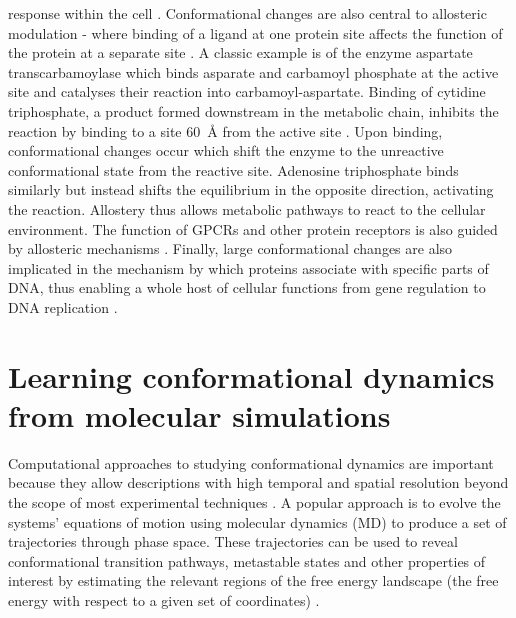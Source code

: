 response within the cell \cite{bockenhauerConformationalDynamicsSingle2011a}. Conformational changes are also central to allosteric modulation - where binding of a ligand at one protein site affects the function of the protein at a separate site \cite{liuAllosteryOverviewIts2016}. A classic example is of the enzyme aspartate transcarbamoylase which binds asparate and carbamoyl phosphate at the active site and catalyses their reaction into carbamoyl-aspartate. Binding of cytidine triphosphate, a product formed downstream in the metabolic chain, inhibits the reaction by binding to a site \SI{60}{\angstrom} from the active site \cite{lipscombStructureMechanismsEscherichia2012}. Upon binding, conformational changes occur which shift the enzyme to the unreactive conformational state from the reactive site.  Adenosine triphosphate binds similarly but instead shifts the equilibrium in the opposite direction, activating the reaction. Allostery thus allows metabolic pathways to react to the cellular environment. The function of GPCRs and other protein receptors is also guided by allosteric mechanisms \cite{changeuxAllostericModulationUnifying2016}. Finally, large conformational changes are also implicated in the mechanism by which proteins associate with specific parts of DNA, thus enabling a whole host of cellular functions from gene regulation to DNA replication \cite{vandervaartCoupledBindingBending2015}.  

\section{Learning conformational dynamics from molecular simulations}

Computational approaches to studying conformational dynamics are important because they allow descriptions with high temporal and spatial resolution beyond the scope of most experimental techniques \cite{hugginsBiomolecularSimulationsDynamics2019}. A popular approach is to evolve the systems' equations of motion using molecular dynamics (MD) to produce a set of trajectories through phase space. These trajectories can be used to reveal conformational transition pathways, metastable states and other properties of interest by estimating the relevant regions of the free energy landscape (the free energy with respect to a given set of coordinates)  \cite{rohrdanzDiscoveringMountainPasses2013a}.  


